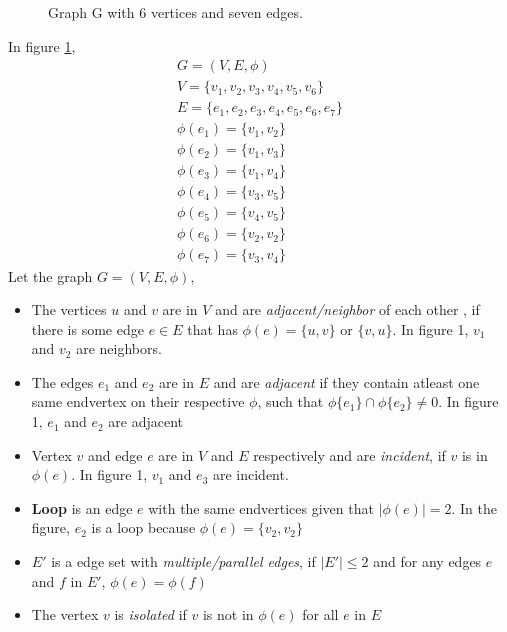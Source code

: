 \begin{itemize}
\begin{figure}[h]
\caption{Graph G with 6 vertices and seven edges.}
\label{graph1}
\end{figure}
In figure \ref{graph1}, 
\begin{equation}
\begin{array}{l}
G=(V,E,\phi) \\
V=\{v_1,v_2,v_3,v_4,v_5,v_6\} \\
E=\{e_1,e_2,e_3,e_4,e_5,e_6,e_7\} \\
\phi(e_1)=\{v_1,v_2\} \\
\phi(e_2)=\{v_1,v_3\} \\
\phi(e_3)=\{v_1,v_4\} \\
\phi(e_4)=\{v_3,v_5\} \\
\phi(e_5)=\{v_4,v_5\} \\
\phi(e_6)=\{v_2,v_2\} \\
\phi(e_7)=\{v_3,v_4\}
\end{array}
\end{equation}
Let the graph $G=(V,E,\phi)$,
	\begin{itemize}
\item The vertices $u$ and $v$ are in $V$ and are \textit{adjacent/neighbor} of each other , if there is some edge $e \in E$ that has $\phi(e)=\{u,v\}$ or $\{v,u\}$. In figure 1, $v_1$ and $v_2$ are neighbors.
\item The edges $e_1$ and $e_2$ are in $E$ and are \textit{adjacent} if they contain atleast one same endvertex on their respective $\phi$, such that $\phi\{e_1\} \cap \phi\{e_2\} \neq 0$. In figure 1, $e_1$ and $e_2$ are adjacent
\item Vertex $v$ and edge $e$ are in $V$ and $E$ respectively and are \textit{incident}, if $v$ is in $\phi(e)$. In figure 1, $v_1$ and $e_3$ are incident.
\item \textbf{Loop} is an edge $e$ with the same endvertices given that $|\phi(e)|=2$. In the figure, $e_2$ is a loop because $\phi(e)=\{v_2,v_2\}$
\item $E'$ is a edge set with \textit{multiple/parallel edges}, if $|E'| \leq 2$ and for any edges $e$ and $f$ in $E'$, $\phi(e)=\phi(f)$
\item The vertex $v$ is \textit{isolated} if $v$ is not in $\phi(e)$ for all $e$ in $E$

\end{itemize}
\end{itemize}
